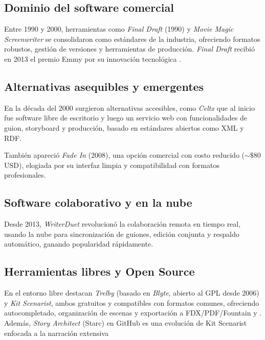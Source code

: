 \documentclass[12pt]{article}
\begin{document}
	\subsection{Dominio del software comercial}
	{\sloppy
		Entre 1990 y 2000, herramientas como \textit{Final Draft} (1990) y \textit{Movie Magic Screenwriter} se consolidaron como estándares de la industria, ofreciendo formatos robustos, gestión de versiones y herramientas de producción. \textit{Final Draft} recibió en 2013 el premio Emmy por su innovación tecnológica \parencite{turn0search22FinalDraft,turn0search27MovieMagic}.
	}

	\subsection{Alternativas asequibles y emergentes}
	{\sloppy
		En la década del 2000 surgieron alternativas accesibles, como \textit{Celtx} \parencite{turn0search23Celtx} que al inicio fue software libre de escritorio y luego un servicio web con funcionalidades de guion, storyboard y producción, basado en estándares abiertos como XML y RDF.

		También apareció \textit{Fade In} (2008), \parencite{turn0search22FinalDraft} una opción comercial con costo reducido (\ensuremath{\sim\$80} USD), elogiada por su interfaz limpia y compatibilidad con formatos profesionales.
	}

	\subsection{Software colaborativo y en la nube}
	Desde 2013, \textit{WriterDuet} \parencite{turn0search24WriterDuet} revolucionó la colaboración remota en tiempo real, usando la nube para sincronización de guiones, edición conjunta y respaldo automático, ganando popularidad rápidamente.

	\subsection{Herramientas libres y Open Source}
	En el entorno libre destacan \textit{Trelby} (basado en \textit{Blyte}, abierto al GPL desde 2006) y \textit{Kit Scenarist}, ambos gratuitos y compatibles con formatos comunes, ofreciendo autocompletado, organización de escenas y exportación a FDX/PDF/Fountain \parencite{turn0search21Trelby} y \parencite{turn0search11KitScenarist}. Además, \textit{Story Architect} (Starc) en GitHub es una evolución de Kit Scenarist enfocada a la narración extensiva \parencite{turn0search17StoryArchitect}
\end{document}
